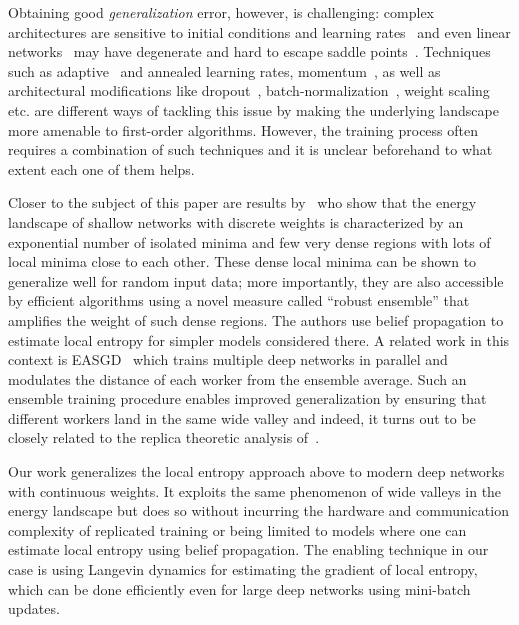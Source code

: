 \documentclass[10pt]{article}
\newcommand{\todo}[1]{{\color{gray}#1}\marginpar{\tiny\noindent{\raggedright{\color{blue}[TODO]}}}}
\begin{document}
Obtaining good \emph{generalization} error, however, is challenging: complex architectures are sensitive to initial conditions and learning rates~\citep{sutskever2013importance} and even linear networks~\citep{kawaguchi2016deep} may have degenerate and hard to escape saddle points~\citep{ge2015escaping,anandkumar2016efficient}. Techniques such as adaptive~\citep{duchi2011adaptive} and annealed learning rates, momentum~\citep{tieleman2012lecture}, as well as architectural modifications like dropout~\citep{srivastava2014dropout}, batch-normalization~\citep{ioffe2015batch,cooijmans2016recurrent}, weight scaling~\citep{salimans2016weight} etc. are different ways of tackling this issue by making the underlying landscape more amenable to first-order algorithms. However, the training process often requires a combination of such techniques and it is unclear beforehand to what extent each one of them helps.

\todo{
Closer to the subject of this paper are results by~\citet{baldassi2015subdominant,baldassi2016unreasonable,baldassi2016multilevel} who show that the energy landscape of shallow networks with discrete weights is characterized by an exponential number of isolated minima and few very dense regions with lots of local minima close to each other. These dense local minima can be shown to generalize well for random input data; more importantly, they are also accessible by efficient algorithms using a novel measure called ``robust ensemble'' that amplifies the weight of such dense regions. The authors use belief propagation to estimate local entropy for simpler models considered there. A related work in this context is EASGD~\citep{zhang2015deep} which trains multiple deep networks in parallel and modulates the distance of each worker from the ensemble average. Such an ensemble training procedure enables improved generalization by ensuring that different workers land in the same wide valley and indeed, it turns out to be closely related to the replica theoretic analysis of~\citep{baldassi2016unreasonable}.

Our work generalizes the local entropy approach above to modern deep networks with continuous weights. It exploits the same phenomenon of wide valleys in the energy landscape but does so without incurring the hardware and communication complexity of replicated training or being limited to models where one can estimate local entropy using belief propagation. The enabling technique in our case is using Langevin dynamics for estimating the gradient of local entropy, which can be done efficiently even for large deep networks using mini-batch updates.
}
\end{document}
